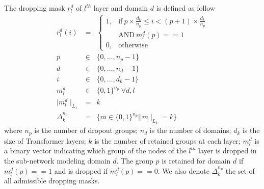 \documentclass[11pt]{article}
\begin{document}
The dropping mask $r_l^d$ of $l^{th}$ layer and domain $d$ is defined as follow
\begin{equation}
\begin{array}{rcl}
r_l^d(i) &=& \begin{cases}
      1, & \text{if}\ p \times \frac{d_k}{n_p} \leqslant i < (p+1) \times \frac{d_k}{n_p} \\
      & \text{AND} \  m_l^d(p) == 1 \\
      0, & \text{otherwise}
    \end{cases} \\
p & \in & \{0,\dots,n_p-1 \} \\
d & \in & \{0,\dots,n_d-1 \} \\
i & \in & \{0,\dots,d_k-1 \} \\
m_l^d & \in & \{0,1\}^{n_p} \ \forall d,l \\
\mid m_l^d \mid_{L_1} & = & k  \\
\Delta^{n_p}_k & = & \{ m \in \{0,1\}^{n_p} | \mid m \mid_{L_1} = k \}
\end{array}
\end{equation}
where $n_p$ is the number of dropout groups; $n_d$ is the number of domains; $d_k$ is the size of Transformer layers; $k$ is the number of retained groups at each layer; $m_l^d$ is a binary vector indicating which group of the nodes of the $l^{th}$ layer is dropped in the sub-network modeling domain $d$. The group $p$ is retained for domain $d$ if $m_l^d(p)==1$ and is dropped if $m_l^d(p)==0$. We also denote $\Delta^{n_p}_k$ the set of all admissible dropping masks. 
\end{document}
